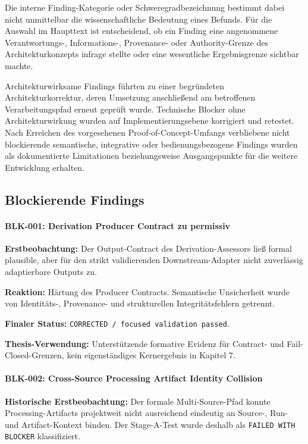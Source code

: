 Die interne Finding-Kategorie oder Schweregradbezeichnung bestimmt dabei nicht
unmittelbar die wissenschaftliche Bedeutung eines Befunds. Für die Auswahl im
Haupttext ist entscheidend, ob ein Finding eine angenommene Verantwortungs-,
Informations-, Provenance- oder Authority-Grenze des Architekturkonzepts
infrage stellte oder eine wesentliche Ergebnisgrenze sichtbar machte.

Architekturwirksame Findings führten zu einer begründeten
Architekturkorrektur, deren Umsetzung anschließend am betroffenen
Verarbeitungspfad erneut geprüft wurde. Technische Blocker ohne
Architekturwirkung wurden auf Implementierungsebene korrigiert und retestet.
Nach Erreichen des vorgesehenen Proof-of-Concept-Umfangs verbliebene
nicht blockierende semantische, integrative oder bedienungsbezogene Findings
wurden als dokumentierte Limitationen beziehungsweise Ausgangspunkte für die
weitere Entwicklung erhalten.

\subsection{Blockierende Findings}

\paragraph{BLK-001: Derivation Producer Contract zu permissiv}

\textbf{Erstbeobachtung:}
Der Output-Contract des Derivation-Assessors ließ formal plausible, aber für den
strikt validierenden Downstream-Adapter nicht zuverlässig adaptierbare Outputs zu.

\textbf{Reaktion:}
Härtung des Producer Contracts. Semantische Unsicherheit wurde von
Identitäts-, Provenance- und strukturellen Integritätsfehlern getrennt.

\textbf{Finaler Status:}
\texttt{CORRECTED / focused validation passed}.

\textbf{Thesis-Verwendung:}
Unterstützende formative Evidenz für Contract- und Fail-Closed-Grenzen, kein
eigenständiges Kernergebnis in Kapitel 7.


\paragraph{BLK-002: Cross-Source Processing Artifact Identity Collision}

\textbf{Historische Erstbeobachtung:}
Der formale Multi-Source-Pfad konnte Processing-Artifacts projektweit nicht
ausreichend eindeutig an Source-, Run- und Artifact-Kontext binden.
Der Stage-A-Test wurde deshalb als \texttt{FAILED WITH BLOCKER} klassifiziert.

